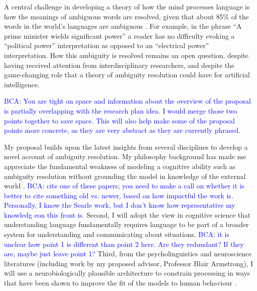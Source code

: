 \documentclass[letterpaper, 12pt]{article}
\newcommand{\bca}[1]{\textcolor{blue}{BCA: #1}} %
\begin{document}

A central challenge in developing a theory of how the mind processes language is how the meanings of ambiguous words are resolved, given that about 85\% of the words in the world's languages are ambiguous \citep{KleinRepresentationPolysemousWords2001}.  For example, in the phrase ``A prime minister wields significant power'' a reader has no difficulty evoking a ``political power'' interpretation as opposed to an ``electrical power'' interpretation.  How this ambiguity is resolved remains an open question, despite having received attention from interdisciplinary researchers, and despite the game-changing role that a theory of ambiguity resolution could have for artificial intelligence. 

\bca{You are tight on space and information about the overview of the proposal is partially overlapping with the research plan idea.  I would merge those two points together to save space.  This will also help make some of the proposal points more concrete, as they are very abstract as they are currently phrased.}

My proposal builds upon the latest insights from several disciplines to develop a novel account of ambiguity resolution.  My philosophy background has made me appreciate the fundamental weakness of modeling a cognitive ability such as ambiguity resolution without grounding the model in knowledge of the external world \citep{harnadSymbolGroundingProblem1990, searleMindsBrainsPrograms1980}. \bca{cite one of these papers; you need to make a call on whether it is better to cite something old vs. newer, based on how impactful the work is.  Personally, I know the Searle work, but I don't know how representative my knowledg eon this front is}.  Second, I will adopt the view in cognitive science that understanding language fundamentally requires language to be part of a broader system for understanding and communicating about situations. \bca{it is unclear how point 1 is different than point 2 here.  Are they redundant?  If they are, maybe just leave point 1?}  Third, from the psycholinguistics and neuroscience literatures (including work by my proposed advisor, Professor Blair Armstrong), I will use a neurobiologically plausible architecture to constrain processing in ways that have been shown to improve the fit of the models to human behaviour \citep{Armstrong2016Disparatesemanticambiguity}.  
\end{document}
